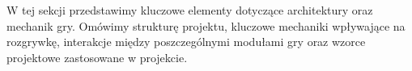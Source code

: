 W tej sekcji przedstawimy kluczowe elementy dotyczące architektury oraz mechanik gry. Omówimy strukturę projektu, kluczowe mechaniki wpływające na rozgrywkę, interakcje między poszczególnymi modułami gry oraz wzorce projektowe zastosowane w projekcie.